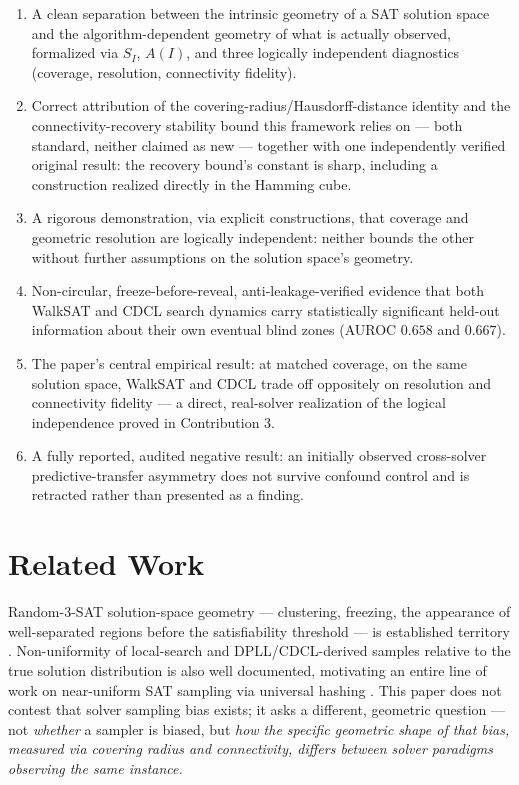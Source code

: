 \documentclass[11pt]{article}
\theoremstyle{definition}
\theoremstyle{remark}
\newcommand{\Shat}{S_I}
\newcommand{\Ahat}[1]{A(#1)}
\begin{document}
\begin{enumerate}
\item A clean separation between the intrinsic geometry of a SAT solution space and the algorithm-dependent geometry of what is actually observed, formalized via $\Shat$, $\Ahat{I}$, and three logically independent diagnostics (coverage, resolution, connectivity fidelity).
\item Correct attribution of the covering-radius/Hausdorff-distance identity and the connectivity-recovery stability bound this framework relies on --- both standard, neither claimed as new --- together with one independently verified original result: the recovery bound's constant is sharp, including a construction realized directly in the Hamming cube.
\item A rigorous demonstration, via explicit constructions, that coverage and geometric resolution are logically independent: neither bounds the other without further assumptions on the solution space's geometry.
\item Non-circular, freeze-before-reveal, anti-leakage-verified evidence that both WalkSAT and CDCL search dynamics carry statistically significant held-out information about their own eventual blind zones (AUROC $0.658$ and $0.667$).
\item The paper's central empirical result: at matched coverage, on the same solution space, WalkSAT and CDCL trade off oppositely on resolution and connectivity fidelity --- a direct, real-solver realization of the logical independence proved in Contribution 3.
\item A fully reported, audited negative result: an initially observed cross-solver predictive-transfer asymmetry does not survive confound control and is retracted rather than presented as a finding.
\end{enumerate}

\section{Related Work}

Random-3-SAT solution-space geometry --- clustering, freezing, the appearance of well-separated regions before the satisfiability threshold --- is established territory \citep{mezard2002analytic,achlioptas2006solution}. Non-uniformity of local-search and DPLL/CDCL-derived samples relative to the true solution distribution is also well documented, motivating an entire line of work on near-uniform SAT sampling via universal hashing \citep{chakraborty2015constrained}. This paper does not contest that solver sampling bias exists; it asks a different, geometric question --- not \emph{whether} a sampler is biased, but \emph{how the specific geometric shape of that bias, measured via covering radius and connectivity, differs between solver paradigms observing the same instance.}
\end{document}
